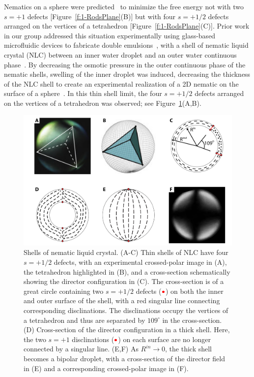 Nematics on a sphere were predicted~\cite{RN42,RN104,RN43} to minimize the free energy not with two $s=+1$ defects [Figure~\ref{f:1-RodsPlane}(B)] but with four $s=+1/2$ defects arranged on the vertices of a tetrahedron [Figure~\ref{f:1-RodsPlane}(C)].
Prior work in our group addressed this situation experimentally using glass-based microfluidic devices to fabricate double emulsions~\cite{RN272}, with a shell of nematic liquid crystal (NLC) between an inner water droplet and an outer water continuous phase~\cite{RN105,RN45}.
By decreasing the osmotic pressure in the outer continuous phase of the nematic shells, swelling of the inner droplet was induced, decreasing the thickness of the NLC shell to create an experimental realization of a 2D nematic on the surface of a sphere~\cite{RN45}.
In this thin shell limit, the four $s = +1/2$ defects arranged on the vertices of a tetrahedron was observed; see Figure~\ref{f:1-Shells}(A,B).
\begin{figure}
  \centering
  \includegraphics{figures/C1/Ch1-Figs_Shells.png}
  \caption{Shells of nematic liquid crystal.
  (A-C) Thin shells of NLC have four $s = +1/2$ defects, with an experimental crossed-polar image in (A), the tetrahedron highlighted in (B), and a cross-section schematically showing the director configuration in (C).
  The cross-section is of a great circle containing two $s = +1/2$ defects (${\color{red} \bullet}$) on both the inner and outer surface of the shell, with a red singular line connecting corresponding disclinations.
  The disclinations occupy the vertices of a tetrahedron and thus are separated by $109^{\circ}$ in the cross-section.
  (D) Cross-section of the director configuration in a thick shell. Here, the two $s = +1$ disclinations (${\color{red} \bullet}$) on each surface are no longer connected by a singular line.
  (E,F) As $R^{in}\rightarrow 0$, the thick shell becomes a bipolar droplet, with a cross-section of the director field in (E) and a corresponding crossed-polar image in (F).}\label{f:1-Shells}
\end{figure}

